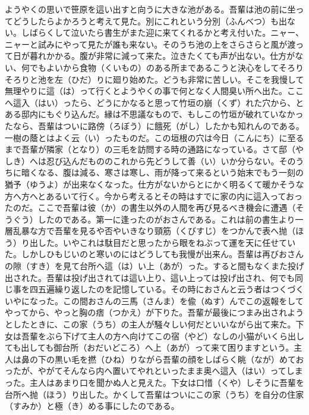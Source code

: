 \documentclass{book}
\begin{document}
ようやくの思いで笹原を這い出すと向うに大きな池がある。吾輩は池の前に坐ってどうしたらよかろうと考えて見た。別にこれという分別（ふんべつ）も出ない。しばらくして泣いたら書生がまた迎に来てくれるかと考え付いた。ニャー、ニャーと試みにやって見たが誰も来ない。そのうち池の上をさらさらと風が渡って日が暮れかかる。腹が非常に減って来た。泣きたくても声が出ない。仕方がない、何でもよいから食物（くいもの）のある所まであるこうと決心をしてそろりそろりと池を左（ひだ）りに廻り始めた。どうも非常に苦しい。そこを我慢して無理やりに這（は）って行くとようやくの事で何となく人間臭い所へ出た。ここへ這入（はい）ったら、どうにかなると思って竹垣の崩（くず）れた穴から、とある邸内にもぐり込んだ。縁は不思議なもので、もしこの竹垣が破れていなかったなら、吾輩はついに路傍（ろぼう）に餓死（がし）したかも知れんのである。一樹の蔭とはよく云（い）ったものだ。この垣根の穴は今日（こんにち）に至るまで吾輩が隣家（となり）の三毛を訪問する時の通路になっている。さて邸（やしき）へは忍び込んだもののこれから先どうして善（い）いか分らない。そのうちに暗くなる、腹は減る、寒さは寒し、雨が降って来るという始末でもう一刻の猶予（ゆうよ）が出来なくなった。仕方がないからとにかく明るくて暖かそうな方へ方へとあるいて行く。今から考えるとその時はすでに家の内に這入っておったのだ。ここで吾輩は彼（か）の書生以外の人間を再び見るべき機会に遭遇（そうぐう）したのである。第一に逢ったのがおさんである。これは前の書生より一層乱暴な方で吾輩を見るや否やいきなり頸筋（くびすじ）をつかんで表へ抛（ほう）り出した。いやこれは駄目だと思ったから眼をねぶって運を天に任せていた。しかしひもじいのと寒いのにはどうしても我慢が出来ん。吾輩は再びおさんの隙（すき）を見て台所へ這（は）い上（あが）った。すると間もなくまた投げ出された。吾輩は投げ出されては這い上り、這い上っては投げ出され、何でも同じ事を四五遍繰り返したのを記憶している。その時におさんと云う者はつくづくいやになった。この間おさんの三馬（さんま）を偸（ぬす）んでこの返報をしてやってから、やっと胸の痞（つかえ）が下りた。吾輩が最後につまみ出されようとしたときに、この家（うち）の主人が騒々しい何だといいながら出て来た。下女は吾輩をぶら下げて主人の方へ向けてこの宿（やど）なしの小猫がいくら出しても出しても御台所（おだいどころ）へ上（あが）って来て困りますという。主人は鼻の下の黒い毛を撚（ひね）りながら吾輩の顔をしばらく眺（なが）めておったが、やがてそんなら内へ置いてやれといったまま奥へ這入（はい）ってしまった。主人はあまり口を聞かぬ人と見えた。下女は口惜（くや）しそうに吾輩を台所へ抛（ほう）り出した。かくして吾輩はついにこの家（うち）を自分の住家（すみか）と極（き）める事にしたのである。
\end{document}
